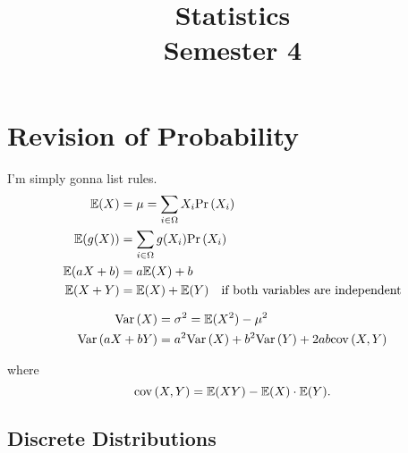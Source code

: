 \documentclass{report}
\title{\Huge{Statistics}\\Semester 4}
\author{\huge{}}
\date{}
\begin{document}
\maketitle
\newpage%
\tableofcontents
\pagebreak

\chapter{Revision of Probability}

I'm simply gonna list rules.
\begin{align*}
	\mathbb{E}(X)    & = \mu =\sum_{i\in\Omega}X_i\mathrm{Pr}\left( X_i \right)                            \\
	\mathbb{E}(g(X)) & = \sum_{i\in\Omega}g(X_i)\mathrm{Pr}\left( X_i \right)                              \\
	\mathbb{E}(aX+b) & = a\mathbb{E}(X) + b                                                  \\
	\mathbb{E}(X+Y)  & = \mathbb{E}(X) + \mathbb{E}(Y)\quad\text{if both variables are independent}
\end{align*}

\begin{align*}
	\mathrm{Var}\left( X \right)     & = \sigma^2 = \mathbb{E}(X^2) - \mu^2          \\
	\mathrm{Var}\left( aX+bY \right) & = a^2\mathrm{Var}\left( X \right) + b^2\mathrm{Var}\left( Y \right)+2ab\mathrm{cov}\left( X,Y \right)
\end{align*}

where
\[
	\mathrm{cov}\left( X,Y \right) = \mathbb{E}(XY) - \mathbb{E}(X)\cdot\mathbb{E}(Y)
	.\]

\section{Discrete Distributions}
\end{document}
